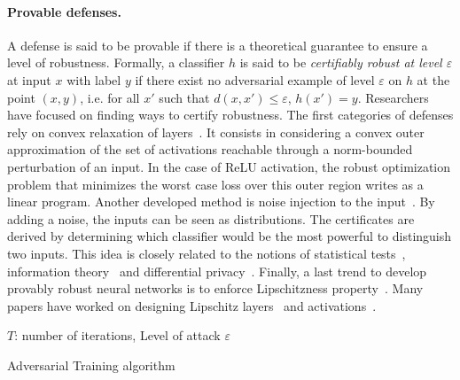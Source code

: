 \paragraph{Provable defenses.} A defense is said to be provable if there is a theoretical guarantee to ensure a level of robustness. Formally, a classifier $h$ is said to be \emph{certifiably robust at level $\varepsilon$} at input $x$ with label $y$ if there exist no adversarial example of level $\varepsilon$ on $h$ at the point $(x,y)$, i.e. for all $x'$ such that $d(x,x')\leq\varepsilon$, $h(x') = y$. Researchers have focused on finding ways to certify robustness. The first categories of defenses rely on convex relaxation of layers~\citep{wong2018provable,wong2018scaling}. It consists in considering a convex outer approximation of the set of activations reachable through a norm-bounded perturbation of an input. In the case of ReLU activation, the robust optimization problem  that minimizes the worst case loss over this outer region writes as a linear program. Another developed method is noise injection to the input~\citep{lecuyer2019certified,KolterRandomizedSmoothing,pinot2019theoretical,salman2019provably}. By adding a noise, the inputs can be seen as distributions. The certificates are derived by determining which classifier would be the most powerful to distinguish two inputs. This idea is closely related to the notions of statistical tests~\citep{KolterRandomizedSmoothing}, information theory~\citep{pinot2019theoretical} and differential privacy~\citep{lecuyer2018certified}. Finally, a last trend to develop provably robust neural networks is to enforce Lipschitzness property~\citep{tsuzuku2018lipschitz}. Many papers have worked on designing Lipschitz layers~\citep{li2019preventing,trockman2021orthogonalizing,skew2021sahil} and activations~\citep{anil2019sorting,singla2021householder,huang2021local}.


\begin{algorithm}[h!]
  \SetAlgoLined
  $T$: number of iterations, Level of attack $\varepsilon$ \\
   \caption{Adversarial Training algorithm}
   \label{algo:adv-training}
\end{algorithm}
  

